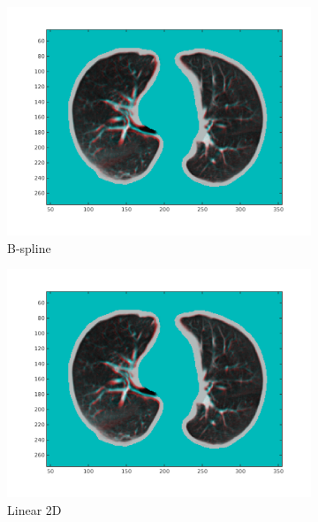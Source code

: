 \documentclass[11pt,a4paper,oneside]{report}
\begin{document}
\begin{figure}[H]
\begin{subfigure}[b]{0.33\textwidth}
    \includegraphics[width=\textwidth, trim=0 50 0 0,clip=true]{figures/task4/visAss_m1.png}
    \caption{B-spline}
  \end{subfigure}%
  \begin{subfigure}[b]{0.33\textwidth}
    \includegraphics[width=\textwidth, trim=0 50 0 0,clip=true]{figures/task4/visAss_m1.png}
    \caption{Linear 2D}
  \end{subfigure}
  \begin{subfigure}[b]{0.33\textwidth}

\end{subfigure}
\end{figure}
\end{document}
